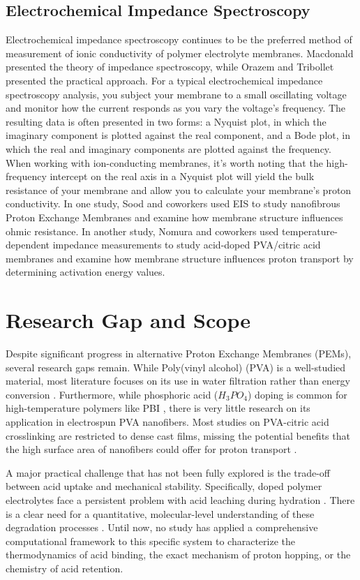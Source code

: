 \documentclass[12pt,a4paper]{report}
\begin{document}
\subsection{Electrochemical Impedance Spectroscopy}
Electrochemical impedance spectroscopy continues to be the preferred method of measurement of ionic conductivity of polymer electrolyte membranes. Macdonald presented the theory of impedance spectroscopy,\cite{65} while Orazem and Tribollet presented the practical approach.\cite{66,67}
For a typical electrochemical impedance spectroscopy analysis, you subject your membrane to a small oscillating voltage and monitor how the current responds as you vary the voltage’s frequency. The resulting data is often presented in two forms: a Nyquist plot, in which the imaginary component is plotted against the real component, and a Bode plot, in which the real and imaginary components are plotted against the frequency. When working with ion-conducting membranes, it’s worth noting that the high-frequency intercept on the real axis in a Nyquist plot will yield the bulk resistance of your membrane and allow you to calculate your membrane’s proton conductivity. In one study, Sood and coworkers used EIS to study nanofibrous Proton Exchange Membranes and examine how membrane structure influences ohmic resistance.\cite{52} In another study, Nomura and coworkers used temperature-dependent impedance measurements to study acid-doped PVA/citric acid membranes and examine how membrane structure influences proton transport by determining activation energy values.\cite{60}

\section{Research Gap and Scope}
Despite significant progress in alternative Proton Exchange Membranes (PEMs), several research gaps remain. While Poly(vinyl alcohol) (PVA) is a well-studied material, most literature focuses on its use in water filtration rather than energy conversion \cite{11}. Furthermore, while phosphoric acid ($H_3PO_4$) doping is common for high-temperature polymers like PBI \cite{20,59}, there is very little research on its application in electrospun PVA nanofibers. Most studies on PVA-citric acid crosslinking are restricted to dense cast films, missing the potential benefits that the high surface area of nanofibers could offer for proton transport \cite{53,54,68}.

A major practical challenge that has not been fully explored is the trade-off between acid uptake and mechanical stability. Specifically, doped polymer electrolytes face a persistent problem with acid leaching during hydration \cite{35}. There is a clear need for a quantitative, molecular-level understanding of these degradation processes \cite{58}. Until now, no study has applied a comprehensive computational framework to this specific system to characterize the thermodynamics of acid binding, the exact mechanism of proton hopping, or the chemistry of acid retention. 
\end{document}
